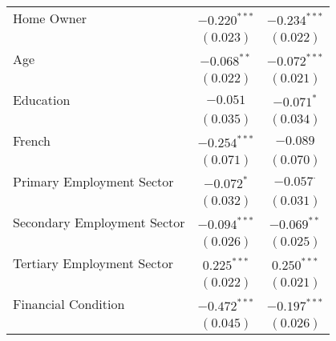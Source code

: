 \begin{center}
\begin{tiny}
\begin{longtable}{l@{} c@{} c@{}}
\quad Home Owner                                                                           & $-0.220^{***}$   & $-0.234^{***}$   \\
                                                                                           & $(0.023)$        & $(0.022)$        \\
\quad Age                                                                                  & $-0.068^{**}$    & $-0.072^{***}$   \\
                                                                                           & $(0.022)$        & $(0.021)$        \\
\quad Education                                                                            & $-0.051$         & $-0.071^{*}$     \\
                                                                                           & $(0.035)$        & $(0.034)$        \\
\quad French                                                                               & $-0.254^{***}$   & $-0.089$         \\
                                                                                           & $(0.071)$        & $(0.070)$        \\
\quad Primary Employment Sector                                                            & $-0.072^{*}$     & $-0.057^{\cdot}$ \\
                                                                                           & $(0.032)$        & $(0.031)$        \\
\quad Secondary Employment Sector                                                          & $-0.094^{***}$   & $-0.069^{**}$    \\
                                                                                           & $(0.026)$        & $(0.025)$        \\
\quad Tertiary Employment Sector                                                           & $0.225^{***}$    & $0.250^{***}$    \\
                                                                                           & $(0.022)$        & $(0.021)$        \\
\quad Financial Condition                                                                  & $-0.472^{***}$   & $-0.197^{***}$   \\
                                                                                           & $(0.045)$        & $(0.026)$        \\

\end{longtable}
\end{tiny}
\end{center}
